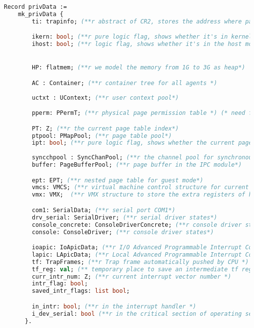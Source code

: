 \begin{lstlisting}[language=Caml]
  Record privData :=
    mk_privData {
        ti: trapinfo; (**r abstract of CR2, stores the address where page fault happens*)

        ikern: bool; (**r pure logic flag, shows whether it's in kernel mode or not*)
        ihost: bool; (**r logic flag, shows whether it's in the host mode or not*)         


        HP: flatmem; (**r we model the memory from 1G to 3G as heap*)

        AC : Container; (**r container tree for all agents *)
        
        uctxt : UContext; (**r user context pool*)

        pperm: PPermT; (**r physical page permission table *) (* need fancy merging *)

        PT: Z; (**r the current page table index*) 
        ptpool: PMapPool; (**r page table pool*)
        ipt: bool; (**r pure logic flag, shows whether the current page map is the kernel's page map*)
        
        syncchpool : SyncChanPool; (**r the channel pool for synchronous IPC*)
        buffer: PageBufferPool; (**r page buffer in the IPC module*)

        ept: EPT; (**r nested page table for guest mode*)
        vmcs: VMCS; (**r virtual machine control structure for current VM *)
        vmx: VMX;  (**r VMX structure to store the extra registers of host *) 

        com1: SerialData; (**r serial port COM1*)
        drv_serial: SerialDriver; (**r serial driver states*)
        console_concrete: ConsoleDriverConcrete; (**r console driver states concrete implementation*)
        console: ConsoleDriver; (**r console driver states*)

        ioapic: IoApicData; (**r I/O Advanced Programmable Interrupt Controller *)
        lapic: LApicData; (**r Local Advanced Programmable Interrupt Controller *)
        tf: TrapFrames; (**r Trap frame automatically pushed by CPU *)
        tf_reg: val; (** temporary place to save an intermediate tf regiter *) 
        curr_intr_num: Z; (**r current interrupt vector number *)
        intr_flag: bool; 
        saved_intr_flags: list bool;

        in_intr: bool; (**r in the interrupt handler *)
        i_dev_serial: bool (**r in the critical section of operating serial *)
      }.
\end{lstlisting}

